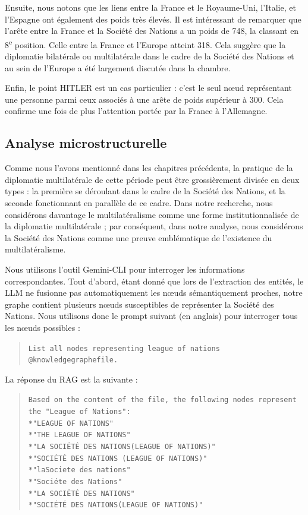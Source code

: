 \documentclass[a4paper,twoside,12pt]{book}
\begin{document}
Ensuite, nous notons que les liens entre la France et le Royaume-Uni, l'Italie, et l'Espagne ont également des poids très élevés. Il est intéressant de remarquer que l'arête entre la France et la Société des Nations a un poids de 748, la classant en 8\textsuperscript{e} position. Celle entre la France et l'Europe atteint 318. Cela suggère que la diplomatie bilatérale ou multilatérale dans le cadre de la Société des Nations et au sein de l'Europe a été largement discutée dans la chambre.

Enfin, le point HITLER est un cas particulier : c'est le seul nœud représentant une personne parmi ceux associés à une arête de poids supérieur à 300. Cela confirme une fois de plus l'attention portée par la France à l'Allemagne.



\subsection{Analyse microstructurelle}

Comme nous l'avons mentionné dans les chapitres précédents, la pratique de la diplomatie multilatérale de cette période peut être grossièrement divisée en deux types : la première se déroulant dans le cadre de la Société des Nations, et la seconde fonctionnant en parallèle de ce cadre. Dans notre recherche, nous considérons davantage le multilatéralisme comme une forme institutionnalisée de la diplomatie multilatérale ; par conséquent, dans notre analyse, nous considérons la Société des Nations comme une preuve emblématique de l'existence du multilatéralisme.

Nous utilisons l'outil Gemini-CLI pour interroger les informations correspondantes. Tout d'abord, étant donné que lors de l'extraction des entités, le LLM ne fusionne pas automatiquement les nœuds sémantiquement proches, notre graphe contient plusieurs nœuds susceptibles de représenter la Société des Nations. Nous utilisons donc le prompt suivant (en anglais) pour interroger tous les nœuds possibles :

\begin{quote}
\texttt{List all nodes representing league of nations @knowledgegraphefile.}
\end{quote}

La réponse du RAG est la suivante :

\begin{quote}
\texttt{Based on the content of the file, the following nodes represent the "League of Nations":\\
*"LEAGUE OF NATIONS"\\
*"THE LEAGUE OF NATIONS"\\
*"LA SOCIÉTÉ DES NATIONS(LEAGUE OF NATIONS)"\\
*"SOCIÉTÉ DES NATIONS (LEAGUE OF NATIONS)"\\
*"laSociete des nations"\\
*"Sociéte des Nations"\\
*"LA SOCIÉTÉ DES NATIONS"\\
*"SOCIÉTÉ DES NATIONS(LEAGUE OF NATIONS)"}
\end{quote}
\end{document}
